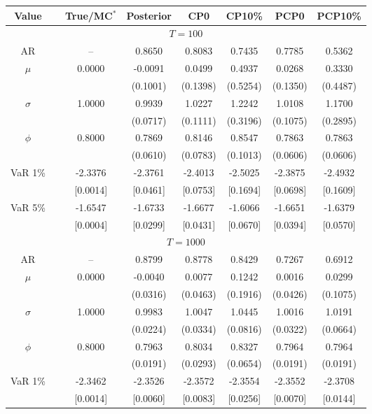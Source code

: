 { \renewcommand{\arraystretch}{1.2} 
\begin{table} 
\center 
\begin{tabular}{cc cccccc} 
Value & & True/MC$^*$ & Posterior & CP0  & CP10\% & PCP0  & PCP10\% \\ \hline 
\hline 
\multicolumn{8}{c}{$T =100$}  \\ 
\hline 
AR && -- & 0.8650 & 0.8083 & 0.7435 & 0.7785 & 0.5362 \\  
$\mu$&& 0.0000 & -0.0091 & 0.0499 & 0.4937 & 0.0268 & 0.3330 \\ 
&&   & (0.1001) & (0.1398) & (0.5254) & (0.1350) & (0.4487) \\ 
$\sigma$&& 1.0000 & 0.9939 & 1.0227 & 1.2242 & 1.0108 & 1.1700 \\ 
&&   & (0.0717) & (0.1111) & (0.3196) & (0.1075) & (0.2895) \\ 
$\phi$&& 0.8000 & 0.7869 & 0.8146 & 0.8547 & 0.7863 & 0.7863 \\ 
&&   & (0.0610) & (0.0783) & (0.1013) & (0.0606) & (0.0606) \\ 
VaR 1\% && -2.3376 & -2.3761 & -2.4013 & -2.5025 & -2.3875 & -2.4932 \\ 
  && [0.0014] & [0.0461] & [0.0753] & [0.1694] & [0.0698] & [0.1609] \\ 
VaR 5\% && -1.6547 & -1.6733 & -1.6677 & -1.6066 & -1.6651 & -1.6379 \\ 
 && [0.0004] & [0.0299] & [0.0431] & [0.0670] & [0.0394] & [0.0570] \\ 
\hline 
\multicolumn{8}{c}{$T =1000$}  \\ 
\hline 
AR && -- & 0.8799 & 0.8778 & 0.8429 & 0.7267 & 0.6912 \\  
$\mu$&& 0.0000 & -0.0040 & 0.0077 & 0.1242 & 0.0016 & 0.0299 \\ 
&&   & (0.0316) & (0.0463) & (0.1916) & (0.0426) & (0.1075) \\ 
$\sigma$&& 1.0000 & 0.9983 & 1.0047 & 1.0445 & 1.0016 & 1.0191 \\ 
&&   & (0.0224) & (0.0334) & (0.0816) & (0.0322) & (0.0664) \\ 
$\phi$&& 0.8000 & 0.7963 & 0.8034 & 0.8327 & 0.7964 & 0.7964 \\ 
&&   & (0.0191) & (0.0293) & (0.0654) & (0.0191) & (0.0191) \\ 
VaR 1\% && -2.3462 & -2.3526 & -2.3572 & -2.3554 & -2.3552 & -2.3708 \\ 
  && [0.0014] & [0.0060] & [0.0083] & [0.0256] & [0.0070] & [0.0144] \\ 

\end{tabular}
\end{table}}
